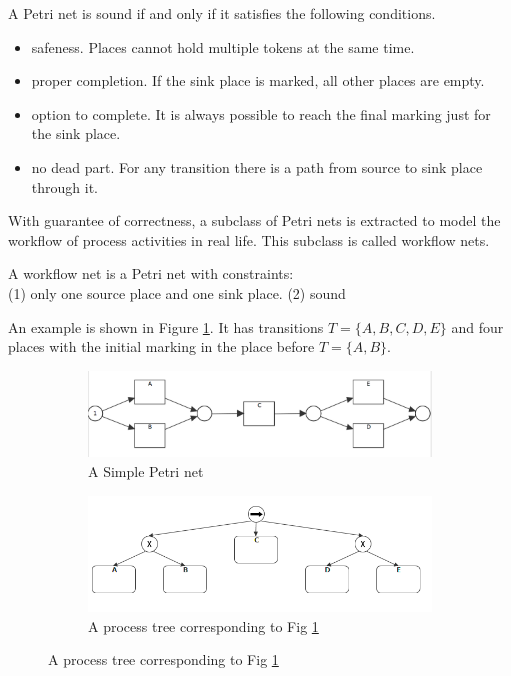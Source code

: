 \begin{definition}[Soundness]
	A Petri net is sound if and only if it satisfies the following conditions.
	\begin{itemize}
		\itemsep0em 
		\item safeness. Places cannot hold multiple tokens at the same time.
		\item proper completion. If the sink place is marked, all other places are empty.
		\item option to complete. It is always possible to reach the final marking just for the sink place.
		\item no dead part. For any transition there is a path from source to sink place through it. 
	\end{itemize}
\end{definition}

With guarantee  of correctness, a subclass of Petri nets is extracted to model the workflow of process activities in real life. This subclass is called workflow nets. 
\begin{definition}
	A workflow net is a Petri net with constraints: \\
	(1) only one source place and one sink place. 
	(2) sound
\end{definition}  

An example is shown in Figure \ref{fig:pn-seq-2}. It has transitions $T=\{A,B,C,D,E\}$ and four places with the initial marking in the place before $T=\{A,B\}$. 
\begin{figure}[!h]
	\centering
	\begin{subfigure}[b]{0.45\textwidth}
		\centering
		\includegraphics[width=\linewidth]{figures/preliminary/PN06_Seq_2_xor_notnested.png}
		\caption{A Simple Petri net}
		\label{fig:pn-seq-2}
	\end{subfigure}%
	\quad
	\begin{subfigure}[b]{0.45\textwidth}
		\centering
		\includegraphics[width=\linewidth]{figures/preliminary/PT06_Seq_2_xor_notnested.png}
		\caption{A process tree corresponding to Fig \ref{fig:pn-seq-2}}
		\label{fig:pt-seq-2}
	\end{subfigure}%
\end{figure}


